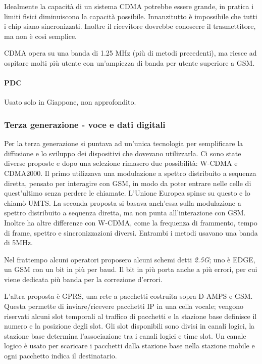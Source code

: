 Idealmente la capacità di un sistema CDMA potrebbe essere grande, in pratica i limiti fisici diminuiscono la capacità possibile.
Innanzitutto è impossibile che tutti i chip siano sincronizzati.
Inoltre il ricevitore dovrebbe conoscere il trasmettitore, ma non è così semplice. 

CDMA opera su una banda di 1.25 MHz (più di metodi precedenti), ma riesce ad ospitare molti più utente con un'ampiezza di banda per utente superiore a GSM.

\paragraph{PDC}
Usato solo in Giappone, non approfondito.

\subsubsection{Terza generazione - voce e dati digitali}
Per la terza generazione si puntava ad un'unica tecnologia per semplificare la diffusione e lo sviluppo dei dispositivi che dovevano utilizzarla.
Ci sono state diverse proposte e dopo una selezione rimasero due possibilità: W-CDMA e CDMA2000.
Il primo utilizzava una modulazione a spettro distribuito a sequenza diretta, pensato per interagire con GSM, in modo da poter entrare nelle celle di quest'ultimo senza perdere le chiamate. L'Unione Europea spinse su questo e lo chiamò UMTS.
La seconda proposta si basava anch'essa sulla modulazione a spettro distribuito a sequenza diretta, ma non punta all'interazione con GSM.
Inoltre ha altre differenze con W-CDMA, come la frequenza di frammento, tempo di frame, spettro e sincronizzazioni diversi.
Entrambi i metodi usavano una banda di 5MHz.

Nel frattempo alcuni operatori proposero alcuni schemi detti \textit{2.5G}; 
uno è EDGE, un GSM con un bit in più per baud. Il bit in più porta anche a più errori, per cui viene dedicata più banda per la correzione d'errori.

L'altra proposta è GPRS, una rete a pacchetti costruita sopra D-AMPS e GSM.
Questa permette di inviare/ricevere pacchetti IP in una cella vocale;
vengono riservati alcuni slot temporali al traffico di pacchetti e la stazione base definisce il numero e la posizione degli slot.
Gli slot disponibili sono divisi in canali logici, la stazione base determina l'associazione tra i canali logici e time slot.
Un canale logico è usato per scaricare i pacchetti dalla stazione base nella stazione mobile e ogni pacchetto indica il destinatario.

